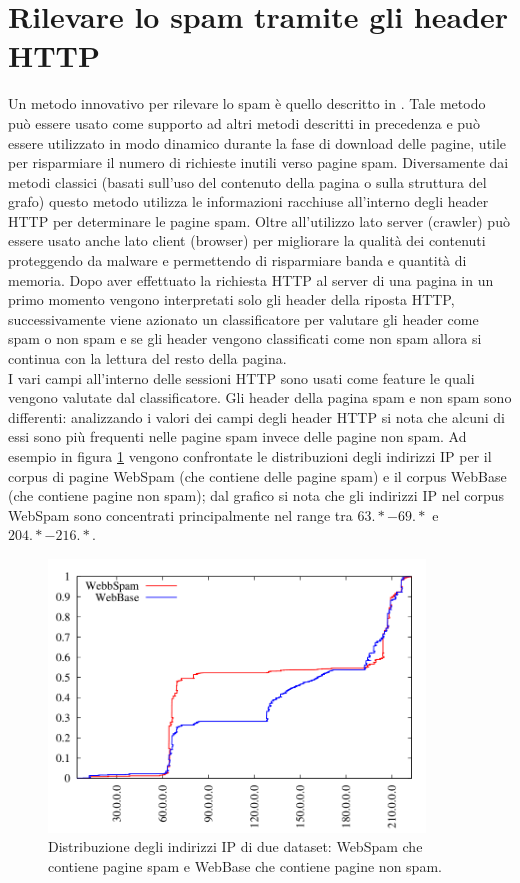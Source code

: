 \section{Rilevare lo spam tramite gli header HTTP}
Un metodo innovativo per rilevare lo spam è quello descritto in \cite{Webb:2008:PWS:1458082.1458129}. Tale metodo può essere usato come supporto ad altri metodi descritti in precedenza e può essere utilizzato in modo dinamico durante la fase di download delle pagine, utile per risparmiare il numero di richieste inutili verso pagine spam. Diversamente dai metodi classici (basati sull'uso del contenuto della pagina o sulla struttura del grafo) questo metodo utilizza le informazioni racchiuse all'interno degli header HTTP per determinare le pagine spam. Oltre all'utilizzo lato server (crawler) può essere usato anche lato client (browser) per migliorare la qualità dei contenuti proteggendo da malware e permettendo di risparmiare banda e quantità di memoria. Dopo aver  effettuato la richiesta HTTP al server di una pagina in un primo momento vengono interpretati solo gli header della riposta HTTP, successivamente viene azionato un classificatore per valutare gli header come spam o non spam e se gli header vengono 
classificati come non spam allora si continua con la lettura del resto della pagina.\\ 
I vari campi all'interno delle sessioni HTTP sono usati come feature le quali vengono  valutate dal classificatore. Gli header della pagina spam e non spam sono differenti: analizzando i valori dei campi degli header HTTP si nota che alcuni di essi sono più frequenti nelle pagine spam invece delle pagine non spam. Ad esempio in figura \ref{img:webb1} vengono confrontate le distribuzioni degli indirizzi IP per il corpus di pagine WebSpam (che contiene delle pagine spam) e il corpus WebBase (che contiene pagine non spam); dal grafico si nota che gli indirizzi IP nel corpus WebSpam sono concentrati principalmente nel range tra \(63.* - 69.*\) e \(204.* - 216.*\).
\begin{figure}
\centering
\includegraphics[width=10cm]{immagini/altre/webb.png}
\caption{Distribuzione degli indirizzi IP di due dataset: WebSpam che contiene pagine spam e WebBase che contiene pagine non spam.}
\label{img:webb1}
\end{figure}

